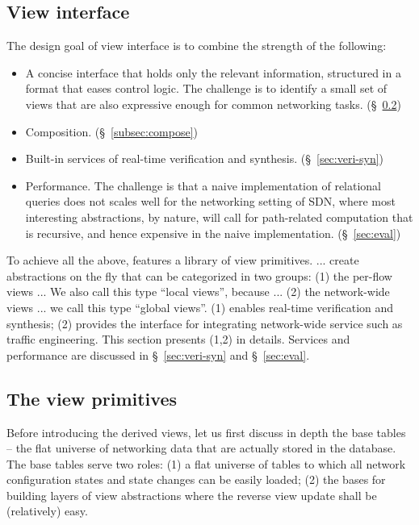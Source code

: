 \label{sec:details}

\subsection{View interface}

The design goal of \Sys view interface is to combine the strength of
the following:
\begin{itemize}
\item A concise interface that holds only the relevant information,
  structured in a format that eases control logic. The challenge is to
  identify a small set of views that are also expressive enough for
  common networking tasks. (\S~\ref{subsec:view-library})
\item Composition. (\S~\ref{subsec:compose})
\item Built-in services of real-time verification and
  synthesis. (\S~\ref{sec:veri-syn})
\item Performance. The challenge is that a naive implementation of
  relational queries does not scales well for the networking setting
  of SDN, where most interesting abstractions, by nature, will call
  for path-related computation that is recursive, and hence expensive
  in the naive implementation. (\S~\ref{sec:eval})
\end{itemize}

To achieve all the above, \Sys features a library of view primitives.
... create abstractions on the fly that can be categorized in two
groups: (1) the per-flow views ... We also call this type ``local
views'', because ... (2) the network-wide views ... we call this type
``global views''.  (1) enables real-time verification and synthesis;
(2) provides the interface for integrating network-wide service such
as traffic engineering.  This section presents (1,2) in
details. Services and performance are discussed in
\S~\ref{sec:veri-syn} and \S~\ref{sec:eval}.


\subsection{The view primitives}
\label{subsec:view-library}


Before introducing the derived views, let us first discuss in depth
the base tables -- the flat universe of networking data that are
actually stored in the database. The base tables serve two roles: (1)
a flat universe of tables to which all network configuration states
and state changes can be easily loaded; (2) the bases for building
layers of view abstractions where the reverse view update shall be
(relatively) easy.


